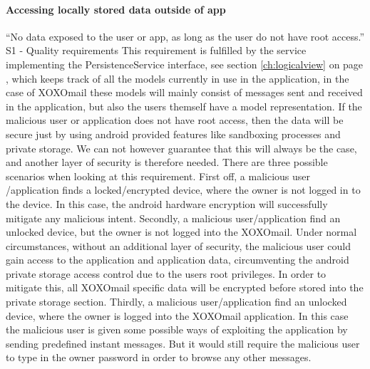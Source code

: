 \paragraph{Accessing locally stored data outside of app}\hfill
\newline
“No data exposed to the user or app, as long as the user do not have root access.” S1 - Quality requirements
\newline
\newline
This requirement is fulfilled by the service implementing the PersistenceService interface, see section \ref{ch:logicalview} on page \pageref{ch:logicalview}, which keeps track of all the models currently in use in the application, in the case of XOXOmail these models will mainly consist of messages sent and received in the application, but also the users themself have a model representation. If the malicious user or application does not have root access, then the data will be secure just by using android provided features like sandboxing processes and private storage. We can not however guarantee that this will always be the case, and another layer of security is therefore needed. 
\newline
\newline
There are three possible scenarios when looking at this requirement. First off, a malicious user /application finds a locked/encrypted device, where the owner is not logged in to the device. In this case, the android hardware encryption will successfully mitigate any malicious intent.
Secondly, a malicious user/application find an unlocked device, but the owner is not logged into the XOXOmail. Under normal circumstances, without an additional layer of security, the malicious user could gain access to the application and application data, circumventing the android private storage access control due to the users root privileges. In order to mitigate this, all XOXOmail specific data will be encrypted before stored into the private storage section. 
Thirdly, a malicious user/application find an unlocked device, where the owner is logged into the XOXOmail application. In this case the malicious user is given some possible ways of exploiting the application by sending predefined instant messages. But it would still require the malicious user to type in the owner password in order to browse any other messages. 


